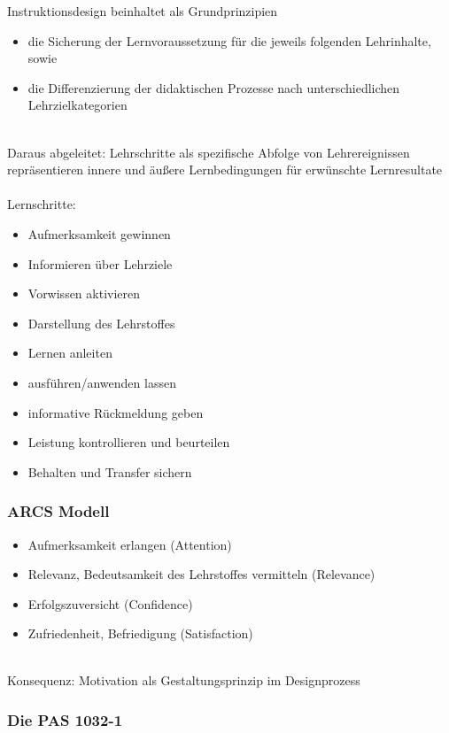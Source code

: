 \documentclass[a4paper]{article}
\begin{document}
Instruktionsdesign beinhaltet als Grundprinzipien
\begin{itemize}
	\item die Sicherung der Lernvoraussetzung für die jeweils folgenden Lehrinhalte, sowie
	\item die Differenzierung der didaktischen Prozesse nach unterschiedlichen Lehrzielkategorien
\end{itemize}
~\\
Daraus abgeleitet: Lehrschritte als spezifische Abfolge von Lehrereignissen \textrightarrow repräsentieren innere und äußere Lernbedingungen für erwünschte Lernresultate
\\~\\
Lernschritte:
\begin{itemize}
	\item Aufmerksamkeit gewinnen
	\item Informieren über Lehrziele
	\item Vorwissen aktivieren
	\item Darstellung des Lehrstoffes
	\item Lernen anleiten
	\item ausführen/anwenden lassen
	\item informative Rückmeldung geben
	\item Leistung kontrollieren und beurteilen
	\item Behalten und Transfer sichern
\end{itemize}

\subsubsection{ARCS Modell}

\begin{itemize}
	\item Aufmerksamkeit erlangen (Attention)
	\item Relevanz, Bedeutsamkeit des Lehrstoffes vermitteln (Relevance)
	\item Erfolgszuversicht (Confidence)
	\item Zufriedenheit, Befriedigung (Satisfaction)
\end{itemize}
~\\
Konsequenz: Motivation als Gestaltungsprinzip im Designprozess

\subsubsection{Die PAS 1032-1}
\end{document}
